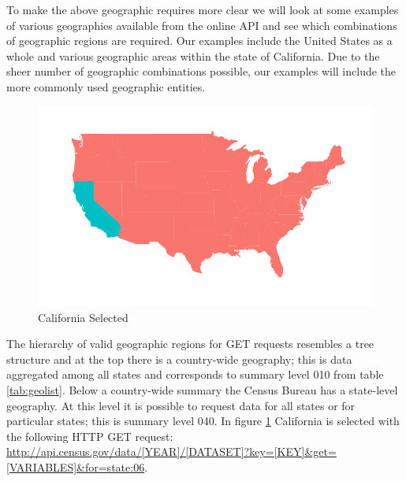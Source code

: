 \documentclass{article}\usepackage[]{graphicx}\usepackage[]{color}
\makeatletter
\def\maxwidth{ %
  \ifdim\Gin@nat@width>\linewidth
    \linewidth
  \else
    \Gin@nat@width
  \fi
}
\newenvironment{knitrout}{}{} %
\makeatother
\begin{document}
To make the above geographic requires more clear we will look at some examples of various geographies available from the online API and see which combinations of geographic regions are required.  Our examples include the United States as a whole and various geographic areas within the state of California.  Due to the sheer number of geographic combinations possible, our examples will include the more commonly used geographic entities.\\
\begin{knitrout}
\color{fgcolor}\begin{figure}[]


{\centering \includegraphics[width=\maxwidth]{figure/state} 

}

\caption[California Selected]{California Selected\label{fig:state}}
\end{figure}


\end{knitrout}

The hierarchy of valid geographic regions for GET requests resembles a tree structure and at the top there is a country-wide geography; this is data aggregated among all states and corresponds to summary level 010 from table \ref{tab:geolist}.  Below a country-wide summary the Census Bureau has a state-level geography.  At this level it is possible to request data for all states or for particular states; this is summary level 040.  In figure \ref{fig:state} California is selected with the following HTTP GET request: \url{http://api.census.gov/data/[YEAR]/[DATASET]?key=[KEY]&get=[VARIABLES]&for=state:06}.\\
\end{document}
